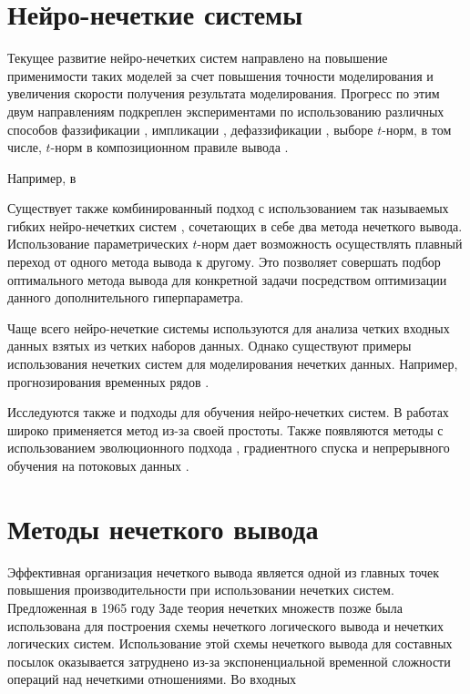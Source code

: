 \section{Нейро-нечеткие системы}

Текущее развитие нейро-нечетких систем направлено на повышение применимости таких моделей за счет повышения точности моделирования и увеличения скорости получения результата моделирования. Прогресс по этим двум направлениям подкреплен экспериментами по использованию различных способов фаззификации \cite{Symmetry2021, Qian2023, Pekaslan2020}, импликации \cite{FernandezPeralta2025, Zhang2022, fern2021}, дефаззификации \cite{VanLeekwijck1999, Nasiboglu2022}, выборе $t$-норм, в том числе, $t$-норм в композиционном правиле вывода \cite{Pourabdollah2015}.

Например, в 

Существует также комбинированный подход с использованием так называемых гибких нейро-нечетких систем \cite{rutkovskiy2010, Cingolani2012}, сочетающих в себе два метода нечеткого вывода. Использование параметрических $t$-норм дает возможность осуществлять плавный переход от одного метода вывода к другому. Это позволяет совершать подбор оптимального метода вывода для конкретной задачи посредством оптимизации данного дополнительного гиперпараметра.

Чаще всего нейро-нечеткие системы используются для анализа четких входных данных взятых из четких наборов данных. Однако существуют примеры использования нечетких систем для моделирования нечетких данных. Например, прогнозирования временных рядов \cite{}.

Исследуются также и подходы для обучения нейро-нечетких систем. В работах широко применяется метод \cite{Wang1992} из-за своей простоты. Также появляются методы с использованием эволюционного подхода \cite{}, градиентного спуска \cite{} и непрерывного обучения на потоковых данных \cite{Lima2010, Alves2021}.


\section{Методы нечеткого вывода}

Эффективная организация нечеткого вывода является одной из главных точек повышения производительности при использовании нечетких систем.  Предложенная в 1965 году Заде теория нечетких множеств \cite{} позже была использована для построения схемы нечеткого логического вывода и нечетких логических систем. Использование этой схемы нечеткого вывода для составных посылок оказывается затруднено из-за экспоненциальной временной сложности операций над нечеткими отношениями. Во входных 


